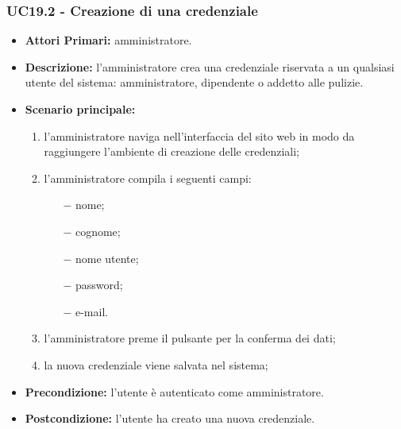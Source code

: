 \subsubsection{ UC19.2 - Creazione di una credenziale}
\begin{itemize}
	\item\textbf{Attori Primari:}
	amministratore.
	\item\textbf{Descrizione:} 
	l'amministratore crea una credenziale riservata a un qualsiasi utente del sistema: amministratore, dipendente o addetto alle pulizie.
	\item\textbf{Scenario principale:} 
	\begin{enumerate}
		\item l'amministratore naviga nell'interfaccia del sito web in modo da raggiungere l'ambiente di creazione delle credenziali;
		\item l'amministratore compila i seguenti campi:
		\begin{itemize}
			\item[$-$] nome;
			\item[$-$] cognome;
			\item[$-$] nome utente;
			\item[$-$] password;
			\item[$-$] e-mail.
		\end{itemize}
		\item l'amministratore preme il pulsante per la conferma dei dati;
		\item la nuova credenziale viene salvata nel sistema;
	\end{enumerate}
	\item\textbf{Precondizione:} 
	l'utente è autenticato come amministratore.
	\item\textbf{Postcondizione:}
	l'utente ha creato una nuova credenziale.
\end{itemize}

